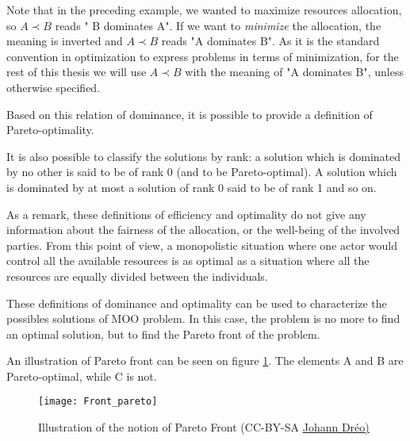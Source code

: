 Note that in the preceding example, we wanted to maximize resources allocation, so \(A \prec B\) reads " B dominates A". If we want to \emph{minimize} the allocation, the meaning is inverted and  \(A \prec B\) reads "A dominates B".
As it is the standard convention in optimization to express problems in terms of minimization, for the rest of this thesis we will use \(A \prec B\) with the meaning of "A dominates B", unless otherwise specified.

Based on this relation of dominance, it is possible to provide a definition of Pareto-optimality.



It is also possible to classify the solutions by rank: a solution which is dominated by no other is said to be of rank 0 (and to be Pareto-optimal). A solution which is dominated by at most a solution of rank 0 said to be of rank 1 and so on.

As a remark, these definitions of efficiency and optimality do not give any information about the fairness of the allocation, or the well-being of the involved parties. From this point of view, a monopolistic situation where one actor would control all the available resources is as optimal as a situation where all the resources are equally divided between the individuals.

These definitions of dominance and optimality can be used to characterize the possibles solutions of MOO problem. In this case, the problem is no more to find an optimal solution, but to find the Pareto front of the problem.

An illustration of Pareto front can be seen on figure \ref{Front_Pareto}. The elements A and B are Pareto-optimal, while C is not.


\begin{figure}
\centering
\texttt{[image: Front\_pareto]}\\
\caption{Illustration of the notion of Pareto Front (CC-BY-SA \href{http://en.wikipedia.org/wiki/File:Front_pareto.svg}{Johann Dréo)}}

\label{Front_Pareto}
\end{figure}

